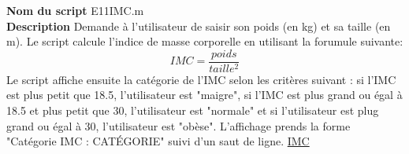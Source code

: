 \textbf{Nom du script}
E11IMC.m\\
\textbf{Description}
Demande à l'utilisateur de saisir son poids (en kg) et sa taille (en m). Le script calcule l'indice de masse corporelle en utilisant la forumule suivante: $$IMC = \frac{poids}{taille^2}$$ Le script affiche ensuite la catégorie de l'IMC selon les critères suivant : si l'IMC est plus petit que 18.5, l'utilisateur est "maigre", si l'IMC est plus grand ou égal à 18.5 et plus petit que 30, l'utilisateur est "normale" et si l'utilisateur est plug grand ou égal à 30, l'utilisateur est "obèse". L'affichage prends la forme "Catégorie IMC : CATÉGORIE" suivi d'un saut de ligne. \href{https://fr.wikipedia.org/wiki/Indice_de_masse_corporelle}{IMC}